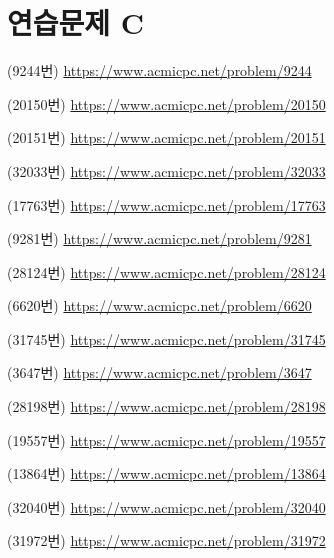 \section{연습문제 C}
\begin{problem}
    (9244번) \url{https://www.acmicpc.net/problem/9244}
\end{problem}
\begin{problem}
    (20150번) \url{https://www.acmicpc.net/problem/20150}
\end{problem}
\begin{problem}
    (20151번) \url{https://www.acmicpc.net/problem/20151}
\end{problem}
\begin{problem}
    (32033번) \url{https://www.acmicpc.net/problem/32033}
\end{problem}
\begin{problem}
    (17763번) \url{https://www.acmicpc.net/problem/17763}
\end{problem}
\begin{problem}
    (9281번) \url{https://www.acmicpc.net/problem/9281}
\end{problem}
\begin{problem}
    (28124번) \url{https://www.acmicpc.net/problem/28124}
\end{problem}
\begin{problem}
    (6620번) \url{https://www.acmicpc.net/problem/6620}
\end{problem}
\begin{problem}
    (31745번) \url{https://www.acmicpc.net/problem/31745}
\end{problem}
\begin{problem}
    (3647번) \url{https://www.acmicpc.net/problem/3647}
\end{problem}
\begin{problem}
    (28198번) \url{https://www.acmicpc.net/problem/28198}
\end{problem}
\begin{problem}
    (19557번) \url{https://www.acmicpc.net/problem/19557}
\end{problem}
\begin{problem}
    (13864번) \url{https://www.acmicpc.net/problem/13864}
\end{problem}
\begin{problem}
    (32040번) \url{https://www.acmicpc.net/problem/32040}
\end{problem}
\begin{problem}
    (31972번) \url{https://www.acmicpc.net/problem/31972}
\end{problem}
